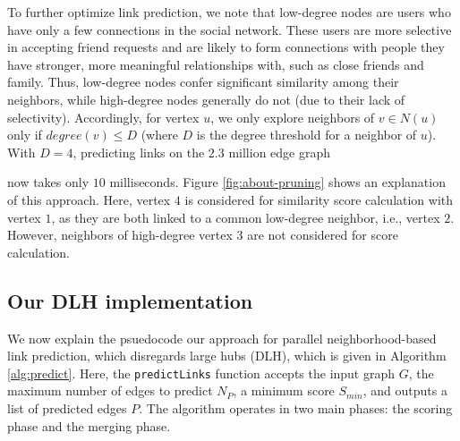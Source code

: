 To further optimize link prediction, we note that low-degree nodes are users who have only a few connections in the social network. These users are more selective in accepting friend requests and are likely to form connections with people they have stronger, more meaningful relationships with, such as close friends and family. Thus, low-degree nodes confer significant similarity among their neighbors, while high-degree nodes generally do not (due to their lack of selectivity). Accordingly, for vertex $u$, we only explore neighbors of $v \in N(u)$ only if $degree(v) \leq D$ (where $D$ is the degree threshold for a neighbor of $u$). With $D = 4$, predicting links on the $2.3$ million edge graph now takes only $10$ milliseconds. Figure \ref{fig:about-pruning} shows an explanation of this approach. Here, vertex $4$ is considered for similarity score calculation with vertex $1$, as they are both linked to a common low-degree neighbor, i.e., vertex $2$. However, neighbors of high-degree vertex $3$ are not considered for score calculation.







% 
% 
% 




\subsection{Our DLH implementation}

We now explain the psuedocode our approach for parallel neighborhood-based link prediction, which disregards large hubs (DLH), which is given in Algorithm \ref{alg:predict}. Here, the \texttt{predictLinks} function accepts the input graph $G$, the maximum number of edges to predict $N_P$, a minimum score $S_{min}$, and outputs a list of predicted edges $P$. The algorithm operates in two main phases: the scoring phase and the merging phase.


